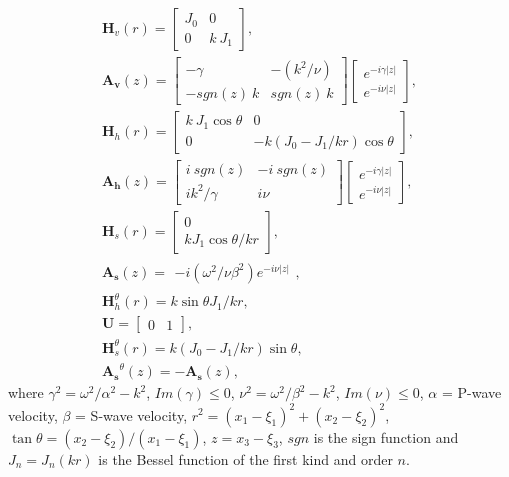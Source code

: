 \documentclass[preprint,5p,times]{elsarticle}
\begin{document}
\begin{equation}
\begin{aligned}
  \boldsymbol{H}_v(r) = \left[\begin{matrix}
    J_0 & 0 \\ 0 & k\ J_1 
    \end{matrix} \right], \\
  \boldsymbol{A_v}(z) = \left[\begin{matrix}
    -\gamma & -\left(k^2/\nu\right) \\ -sgn(z)\ k & sgn(z)\ k 
    \end{matrix} \right] \left[\begin{matrix}
    e^{-i \gamma |z|} \\ e^{-i \nu |z|}
    \end{matrix} \right],\\
  \boldsymbol{H}_h(r) = \left[\begin{matrix}
    k\ J_1 \cos \theta & 0 \\ 0 & - k (J_0 - J_1/kr)\cos \theta 
    \end{matrix} \right], \\
  \boldsymbol{A_h}(z) =  \left[\begin{matrix}
    i\ sgn(z) & - i\ sgn(z) \\ i k^2/\gamma &  i \nu
    \end{matrix} \right] \left[\begin{matrix}
    e^{-i \gamma |z|} \\ e^{-i \nu |z|}
    \end{matrix} \right], \\
  \boldsymbol{H}_s(r) = \left[\begin{matrix}
    0 \\ k J_1 \cos \theta / kr
    \end{matrix} \right], \\
  \boldsymbol{A_s}(z) =  \begin{matrix}
	-i \left(\omega^2 /\nu \beta^2 \right) e^{-i \nu |z|}
	\end{matrix}, \\
  \boldsymbol{H}_h^\theta(r) =k \sin \theta J_1/kr, \\
  \boldsymbol{U} = \left[\begin{matrix} 0 & 1 \end{matrix}\right], \\
   \boldsymbol{H}_s^\theta(r) =  k (J_0 - J_1/kr)\sin \theta, \\
   \boldsymbol{A_s}^\theta(z) = -\boldsymbol{A_s}(z),
\end{aligned}
\end{equation}
where $\gamma^2 = \omega^2 / \alpha^2 - k^2$, $ Im(\gamma) \le 0$, $\nu^2 = \omega^2 / \beta^2 - k^2$, $ Im(\nu) \le 0$, $\alpha$ = P-wave velocity, $\beta$ = S-wave velocity, $r^2 = (x_1 - \xi_1)^2 + (x_2 - \xi_2)^2$,$\tan \theta = (x_2 - \xi_2) / (x_1 - \xi_1)$, $z = x_3 - \xi_3$, $sgn$ is the sign function and $J_n = J_n(kr)$ is the Bessel function of the first kind and order $n$.
\end{document}
